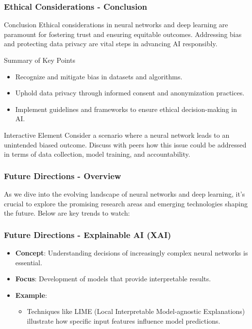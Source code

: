 \documentclass{beamer}
\begin{document}
\begin{frame}[fragile]
    \frametitle{Ethical Considerations - Conclusion}
    \begin{block}{Conclusion}
        Ethical considerations in neural networks and deep learning are paramount for fostering trust and ensuring equitable outcomes. Addressing bias and protecting data privacy are vital steps in advancing AI responsibly.
    \end{block}

    \begin{block}{Summary of Key Points}
        \begin{itemize}
            \item Recognize and mitigate bias in datasets and algorithms.
            \item Uphold data privacy through informed consent and anonymization practices.
            \item Implement guidelines and frameworks to ensure ethical decision-making in AI.
        \end{itemize}
    \end{block}
    
    \begin{block}{Interactive Element}
        Consider a scenario where a neural network leads to an unintended biased outcome. Discuss with peers how this issue could be addressed in terms of data collection, model training, and accountability.
    \end{block}
\end{frame}

\begin{frame}[fragile]
    \frametitle{Future Directions - Overview}
    As we dive into the evolving landscape of neural networks and deep learning, it’s crucial to explore the promising research areas and emerging technologies shaping the future. Below are key trends to watch:
\end{frame}

\begin{frame}[fragile]
    \frametitle{Future Directions - Explainable AI (XAI)}
    \begin{itemize}
        \item \textbf{Concept}: Understanding decisions of increasingly complex neural networks is essential.
        \item \textbf{Focus}: Development of models that provide interpretable results.
        \item \textbf{Example}: 
        \begin{itemize}
            \item Techniques like LIME (Local Interpretable Model-agnostic Explanations) illustrate how specific input features influence model predictions.
        \end{itemize}
    \end{itemize}
\end{frame}
\end{document}
